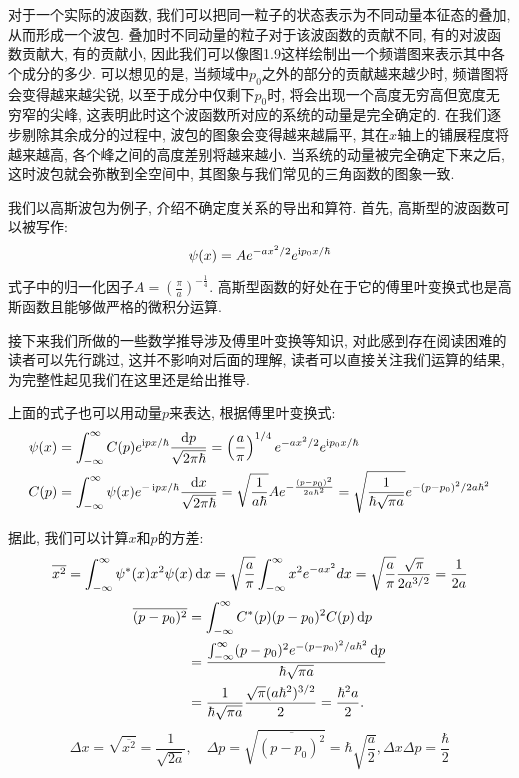 对于一个实际的波函数, 我们可以把同一粒子的状态表示为不同动量本征态的叠加, 从而形成一个波包. 叠加时不同动量的粒子对于该波函数的贡献不同, 有的对波函数贡献大, 有的贡献小, 因此我们可以像图1.9这样绘制出一个频谱图来表示其中各个成分的多少. 可以想见的是, 当频域中$p_0$之外的部分的贡献越来越少时, 频谱图将会变得越来越尖锐, 以至于成分中仅剩下$p_0$时, 将会出现一个高度无穷高但宽度无穷窄的尖峰, 这表明此时这个波函数所对应的系统的动量是完全确定的. 在我们逐步剔除其余成分的过程中, 波包的图象会变得越来越扁平, 其在$x$轴上的铺展程度将越来越高, 各个峰之间的高度差别将越来越小. 当系统的动量被完全确定下来之后, 这时波包就会弥散到全空间中, 其图象与我们常见的三角函数的图象一致.

我们以高斯波包为例子, 介绍不确定度关系的导出和算符. 首先, 高斯型的波函数可以被写作:
\[
\psi(x) = Ae^{-ax^2/2}e^{\mathop{}\!\mathrm{i} p_{0}x/\hbar}
\]
式子中的归一化因子$A=(\frac{\pi}{a})^{-\frac{1}{4}}$. 高斯型函数的好处在于它的傅里叶变换式也是高斯函数且能够做严格的微积分运算.

接下来我们所做的一些数学推导涉及傅里叶变换等知识, 对此感到存在阅读困难的读者可以先行跳过, 这并不影响对后面的理解, 读者可以直接关注我们运算的结果, 为完整性起见我们在这里还是给出推导.

上面的式子也可以用动量$p$来表达, 根据傅里叶变换式:
\begin{align*}
\psi(x) & = \int_{-\infty}^{\infty}C(p)e^{\mathop{}\!\mathrm{i} px/\hbar}\frac{\mathop{}\!\mathrm{d} p}{\sqrt{2\pi \hbar}}= \left( \frac{a}{\pi} \right)^{1/4} e^{-ax^2/2} e^{\mathop{}\!\mathrm{i} p_0x/\hbar} \\
C(p) & = \int_{-\infty}^{\infty}\psi(x)e^{-\mathop{}\!\mathrm{i} px/\hbar}\frac{\mathop{}\!\mathrm{d} x}{\sqrt{2\pi \hbar}}=\sqrt{\frac{1}{a\hbar}}Ae^{-\frac{(p-p_0)^2}{2a\hbar^2}} = \sqrt{\frac{1}{\hbar \sqrt{\pi a}}} e^{-(p-p_0)^2 / 2a\hbar^2} \\
\end{align*}

据此, 我们可以计算$x$和$p$的方差:
\[
\overline{x^2} = \int_{-\infty}^{\infty} \psi^*(x) x^2 \psi(x) \mathop{}\!\mathrm{d} x = \sqrt{\frac{a}{\pi}} \int_{-\infty}^{\infty} x^2 e^{-ax^2} dx = \sqrt{\frac{a}{\pi}} \frac{\sqrt{\pi}}{2 a^{3/2}} = \frac{1}{2a}
\]
\begin{align*}
\overline{(p-p_0)^2}
&= \int_{-\infty}^{\infty} C^*(p) (p-p_0)^2 C(p) \mathop{}\!\mathrm{d} p \\
&= \frac{\int_{-\infty}^{\infty} (p-p_0)^2 e^{-(p-p_0)^2 / a\hbar^2} \mathop{}\!\mathrm{d} p}{\hbar \sqrt{\pi a}} \\
&= \frac{1}{\hbar \sqrt{\pi a}} \frac{\sqrt{\pi} (a\hbar^2)^{3/2}}{2}
 = \frac{\hbar^2 a}{2}.
\end{align*}
\[
\Delta x = \sqrt{\overline{x^2}}= \frac{1}{\sqrt{2a}}, \quad \Delta p = \sqrt{\overline{(p-p_0)^2}} = \hbar\sqrt{\frac{a}{2}}, \Delta x \Delta p =\frac{\hbar}{2}
\]

